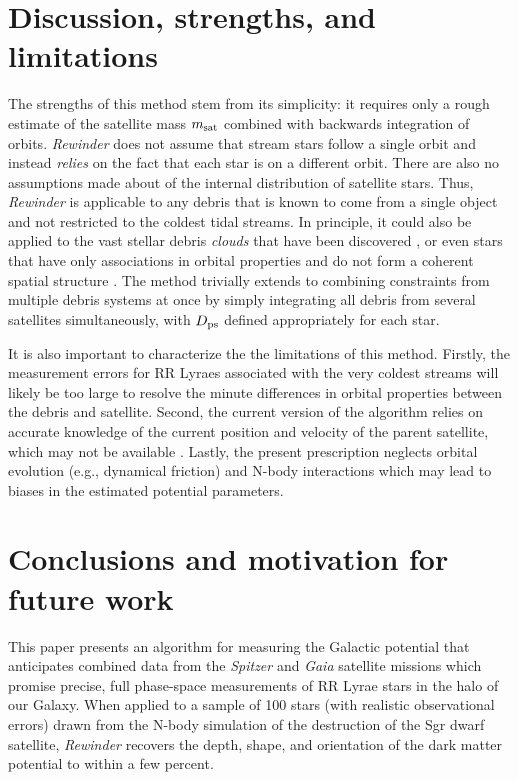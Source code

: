 \documentclass{emulateapj}
\begin{document}
\section{Discussion, strengths, and limitations}
\label{sec:discussion}

The strengths of this method stem from its simplicity: it requires
only a rough estimate of the satellite mass $m_{\rm sat}$ combined
with backwards integration of orbits. 
\emph{Rewinder} does not assume that stream stars follow
a single orbit and instead \emph{relies}
on the fact that each star is on a different orbit. There are also no assumptions made
about of the internal distribution of satellite
stars. Thus, \emph{Rewinder} is applicable to any debris that is
known to come from a single object and not restricted to the coldest
tidal streams. In principle, it could also be applied to the
vast stellar debris {\it clouds} that have been discovered 
\citep[e.g., the Triangulum-Andromeda and Hercules-Aquila
  clouds;][]{rochapinto04,belokurov06}, or even stars that have only
associations in orbital properties and do not form a coherent spatial
structure \citep[e.g.][]{helmi99}. The method trivially extends to
combining constraints from multiple debris systems at once by simply
integrating all debris from several satellites simultaneously, with
$D_{\rm ps}$ defined appropriately for each star.

It is also important to characterize the the limitations of this
method. Firstly, the measurement errors for RR Lyraes associated with
the very coldest streams \citep[e.g., the globular clusters Pal5 and
  GD1;][]{odenkirchen02,koposov10} will likely be too large to resolve
the minute differences in orbital properties between the debris and
satellite. Second, the current version of the algorithm
relies on accurate knowledge of the current position and velocity of
the parent satellite, which may not be available 
\citep[for example, the Orphan Stream;][]{belokurov07}. Lastly, the
present prescription neglects orbital evolution (e.g.,
dynamical friction) and N-body interactions which may lead to biases in
the estimated potential parameters.

\section{Conclusions and motivation for future work}
\label{sec:conclusion}

This paper presents an algorithm for measuring the Galactic potential
that anticipates combined data from the {\it Spitzer} and {\it Gaia} satellite
missions which promise precise, full phase-space measurements of RR
Lyrae stars in the halo of our Galaxy. When applied to a sample of 100
stars (with realistic observational errors) drawn from the
\cite{law10} N-body simulation of the destruction of the Sgr dwarf
satellite, \emph{Rewinder} recovers the depth, shape, and orientation of the dark
matter potential to within a few percent.
\end{document}
